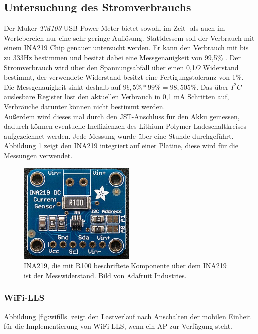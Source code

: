 \subsection{Untersuchung des Stromverbrauchs}
\label{ch:phase1:sec:energie}
Der Muker \emph{TM103} USB-Power-Meter bietet sowohl im Zeit- als auch im Wertebereich nur eine sehr geringe Auflösung.
Stattdessem soll der Verbrauch mit einem INA219 Chip genauer untersucht werden.
Er kann den Verbrauch mit bis zu 333Hz bestimmen und besitzt dabei eine Messgenauigkeit von 99,5\% \cite{texas2015ina}.
Der Stromverbrauch wird über den Spannungsabfall über einen 0,1$\Omega$ Widerstand bestimmt, der verwendete Widerstand besitzt eine Fertigungstoleranz von 1\%.
Die Messgenauigkeit sinkt deshalb auf $99,5\% * 99\% = 98,505\%$. 
Das über $I^2C$ auslesbare Register löst den aktuellen Verbrauch in 0,1 mA Schritten auf, Verbräuche darunter können nicht bestimmt werden.\\
Außerdem wird dieses mal durch den JST-Anschluss für den Akku gemessen, dadurch können eventuelle Ineffizienzen des Lithium-Polymer-Ladeschaltkreises aufgezeichnet werden. 
Jede Messung wurde über eine Stunde durchgeführt.
Abbildung \ref{fig:ina219} zeigt den INA219 integriert auf einer Platine, diese wird für die Messungen verwendet.

\begin{figure}[h!]
  \centering
	\includegraphics[width=0.5\textwidth]{images/ina219ada.png}
  \caption{INA219, die mit R100 beschriftete Komponente über dem INA219 ist der Messwiderstand. Bild von Adafruit Industries\protect \footnotemark.}
  \label{fig:ina219}
\end{figure}

\subsubsection{WiFi-LLS}
\label{ch:phase1:sec:powerwifills}
Abbildung \ref{fig:wifills} zeigt den Lastverlauf nach Anschalten der mobilen Einheit für die Implementierung von WiFi-LLS, wenn ein AP zur Verfügung steht. 

